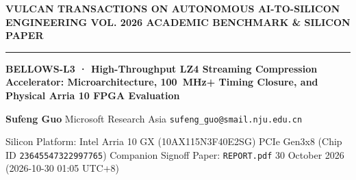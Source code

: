 \documentclass[11pt,a4paper]{article}
\begin{document}
{\scriptsize\sffamily\textcolor{vulcan}{\textbf{VULCAN TRANSACTIONS ON AUTONOMOUS AI-TO-SILICON ENGINEERING \hfill VOL. 2026 \textperiodcentered{} ACADEMIC BENCHMARK \& SILICON PAPER}}\par}

\vspace{1pt}\textcolor{vulcan}{\rule{\textwidth}{1.2pt}}\vspace{3pt}

\begin{center}

{\sffamily\LARGE\bfseries BELLOWS-L3 · High-Throughput LZ4 Streaming Compression Accelerator: Microarchitecture, 100~MHz+ Timing Closure, and Physical Arria 10 FPGA Evaluation\par}\vspace{3pt}

{\small\sffamily\textbf{Sufeng Guo} \textperiodcentered{} Microsoft Research Asia \textperiodcentered{} \texttt{sufeng\_guo@smail.nju.edu.cn}\par}\vspace{1pt}

{\scriptsize\sffamily\textcolor{black!75}{Silicon Platform: Intel Arria 10 GX (\allowbreak{}10AX115N3F40E2SG)\allowbreak{} PCIe Gen3x8 (Chip ID \texttt{23645547322997765}) \textperiodcentered{} Companion Signoff Paper: \texttt{REPORT.pdf} \textperiodcentered{} 30 October 2026 (\allowbreak{}2026-10-30 01:05 UTC+\allowbreak{}8)\allowbreak{}}\par}

\end{center}\vspace{2pt}
\end{document}
